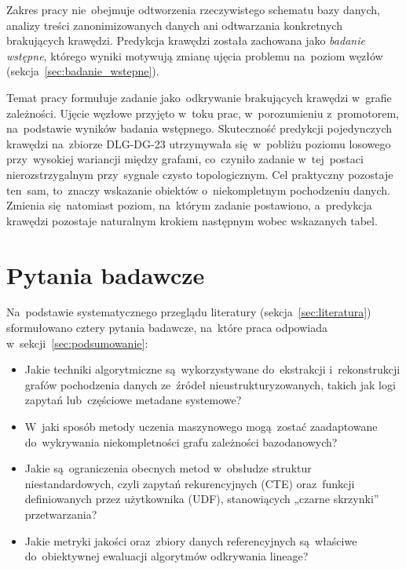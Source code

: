 \documentclass[polish,master,a4paper,oneside]{ppfcmthesis}
\renewcommand{\_}{\origtextunderscore\ifmmode\else\allowbreak\fi}
\begin{document}
Zakres pracy nie~obejmuje odtworzenia rzeczywistego schematu bazy danych,
analizy treści zanonimizowanych danych ani odtwarzania konkretnych brakujących
krawędzi. Predykcja krawędzi została zachowana jako \emph{badanie wstępne},
którego wyniki motywują zmianę ujęcia problemu na~poziom węzłów
(sekcja~\ref{sec:badanie_wstepne}).

Temat pracy formułuje zadanie jako~odkrywanie brakujących krawędzi
w~grafie zależności. Ujęcie węzłowe przyjęto w~toku prac, w~porozumieniu
z~promotorem, na~podstawie wyników badania wstępnego. Skuteczność predykcji
pojedynczych krawędzi na~zbiorze DLG-DG-23 utrzymywała się~w~pobliżu poziomu
losowego przy~wysokiej wariancji między grafami, co~czyniło zadanie w~tej~postaci
nierozstrzygalnym
przy~sygnale czysto topologicznym. Cel praktyczny pozostaje ten~sam,
to~znaczy wskazanie obiektów o~niekompletnym pochodzeniu danych. Zmienia
się~natomiast poziom, na~którym zadanie postawiono, a~predykcja krawędzi
pozostaje naturalnym krokiem następnym wobec wskazanych tabel.


\section{Pytania badawcze}
\label{sec:pytania}

Na~podstawie systematycznego przeglądu literatury (sekcja~\ref{sec:literatura})
sformułowano cztery pytania badawcze, na~które praca odpowiada
w~sekcji~\ref{sec:podsumowanie}:

\begin{itemize}
  \item[\textbf{PB1}] Jakie techniki algorytmiczne są~wykorzystywane
        do~ekstrakcji i~rekonstrukcji grafów pochodzenia danych ze~źródeł
        nieustrukturyzowanych, takich jak logi zapytań lub~częściowe
        metadane systemowe?
  \item[\textbf{PB2}] W~jaki sposób metody uczenia maszynowego mogą~zostać
        zaadaptowane do~wykrywania niekompletności grafu zależności
        bazodanowych?
  \item[\textbf{PB3}] Jakie są~ograniczenia obecnych metod w~obsłudze
        struktur niestandardowych, czyli zapytań rekurencyjnych (CTE) oraz~funkcji
        definiowanych przez użytkownika (UDF), stanowiących „czarne skrzynki''
        przetwarzania?
  \item[\textbf{PB4}] Jakie metryki jakości oraz~zbiory danych referencyjnych
        są~właściwe do~obiektywnej ewaluacji algorytmów odkrywania lineage?
\end{itemize}
\end{document}
